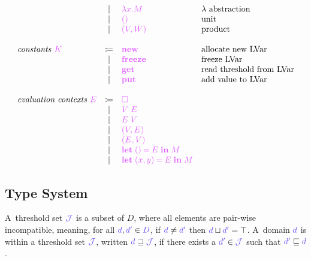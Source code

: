 \documentclass[main.tex]{subfiles}
\begin{document}
\[\begin{array}{lcll}
  & \sep      & \tm{\lambda x.M}              & \lambda \text{ abstraction} \\
  & \sep      & \tm{\unit}                    & \text{unit} \\
  & \sep      & \tm{\pair{V}{W}}              & \text{product} \\
  \\
  \textit{constants }\tm{K}
  & \coloneqq & \tm{\lvarnew}                 & \text{allocate new LVar} \\
  & \sep      & \tm{\lvarfreeze}              & \text{freeze LVar} \\
  & \sep      & \tm{\lvarget}                 & \text{read threshold from
                                                  LVar} \\
  & \sep      & \tm{\lvarput}                 & \text{add value to LVar} \\
  \\
  \textit{evaluation contexts }\tm{E}
  & \coloneqq & \tm{\hole}                 \\
  & \sep      & \tm{V\; E}                 \\
  & \sep      & \tm{E\; V}                 \\
  & \sep      & \tm{(V, E)}                \\
  & \sep      & \tm{(E, V)}                \\
  & \sep      & \tm{\letunit{E}{M}}        \\
  & \sep      & \tm{\letpair{x}{y}{E}{M}}  \\
\end{array}
\]

\subsection{Type System}%
\label{sec:llam-typing}

\begin{definition}
  A~threshold set $\ty{\tyJ}$ is a subset of $D$, where all elements are pair-wise incompatible, meaning,  for all $\ty{d}, \ty{d'} \in \ty{D}$, if $\ty{d} \neq \ty{d'}$ then $\ty{d} \sqcup \ty{d'} = \top$.
  A~domain $\ty{d}$ is within a threshold set $\tyJ$, written $\ty{d}\sqsupseteq\tyJ$, if there exists a $\ty{d'}\in\tyJ$ such that $\ty{d'}\sqsubseteq\ty{d}$.
\end{definition}
\end{document}

